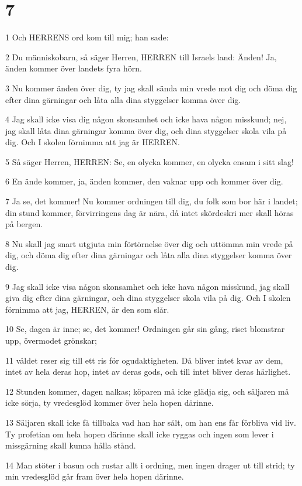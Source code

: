 \chapter{7}

\par 1 Och HERRENS ord kom till mig; han sade:
\par 2 Du människobarn, så säger Herren, HERREN till Israels land: Änden! Ja, änden kommer över landets fyra hörn.
\par 3 Nu kommer änden över dig, ty jag skall sända min vrede mot dig och döma dig efter dina gärningar och låta alla dina styggelser komma över dig.
\par 4 Jag skall icke visa dig någon skonsamhet och icke hava någon misskund; nej, jag skall låta dina gärningar komma över dig, och dina styggelser skola vila på dig. Och I skolen förnimma att jag är HERREN.
\par 5 Så säger Herren, HERREN: Se, en olycka kommer, en olycka ensam i sitt slag!
\par 6 En ände kommer, ja, änden kommer, den vaknar upp och kommer över dig.
\par 7 Ja se, det kommer! Nu kommer ordningen till dig, du folk som bor här i landet; din stund kommer, förvirringens dag är nära, då intet skördeskri mer skall höras på bergen.
\par 8 Nu skall jag snart utgjuta min förtörnelse över dig och uttömma min vrede på dig, och döma dig efter dina gärningar och låta alla dina styggelser komma över dig.
\par 9 Jag skall icke visa någon skonsamhet och icke hava någon misskund, jag skall giva dig efter dina gärningar, och dina styggelser skola vila på dig. Och I skolen förnimma att jag, HERREN, är den som slår.
\par 10 Se, dagen är inne; se, det kommer! Ordningen går sin gång, riset blomstrar upp, övermodet grönskar;
\par 11 våldet reser sig till ett ris för ogudaktigheten. Då bliver intet kvar av dem, intet av hela deras hop, intet av deras gods, och till intet bliver deras härlighet.
\par 12 Stunden kommer, dagen nalkas; köparen må icke glädja sig, och säljaren må icke sörja, ty vredesglöd kommer över hela hopen därinne.
\par 13 Säljaren skall icke få tillbaka vad han har sålt, om han ens får förbliva vid liv. Ty profetian om hela hopen därinne skall icke ryggas och ingen som lever i missgärning skall kunna hålla stånd.
\par 14 Man stöter i basun och rustar allt i ordning, men ingen drager ut till strid; ty min vredesglöd går fram över hela hopen därinne.
